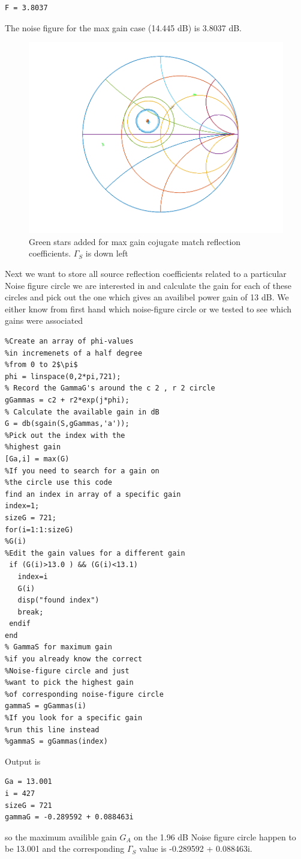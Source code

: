 \documentclass{article}
\begin{document}
\begin{multicols}{2}
\begin{verbatim}
F = 3.8037
\end{verbatim}
The noise figure for the max gain case (14.445 dB) is 3.8037 dB.
\begin{figure}[H]
\centering
  \includegraphics[width=\linewidth]{conjugate.png}
  \caption{Green stars added for max gain cojugate match reflection coefficients. $\Gamma_S$ is down left}
  \label{fig4}
\end{figure}
Next we want to store all source reflection coefficients related to a particular
Noise figure circle we are interested in and calculate the gain for
each of these circles and pick out the one which gives an availibel power gain
of 13 dB.
We either know from first hand which noise-figure circle
or we tested to see which gains were associated
\begin{verbatim}
%Create an array of phi-values
%in incremenets of a half degree
%from 0 to 2$\pi$
phi = linspace(0,2*pi,721);
% Record the GammaG's around the c 2 , r 2 circle
gGammas = c2 + r2*exp(j*phi);
% Calculate the available gain in dB
G = db(sgain(S,gGammas,'a'));
%Pick out the index with the
%highest gain
[Ga,i] = max(G) 
%If you need to search for a gain on
%the circle use this code
find an index in array of a specific gain
index=1;
sizeG = 721;
for(i=1:1:sizeG)
%G(i)
%Edit the gain values for a different gain
 if (G(i)>13.0 ) && (G(i)<13.1)
   index=i
   G(i)
   disp("found index")
   break;
 endif
end
% GammaS for maximum gain
%if you already know the correct
%Noise-figure circle and just
%want to pick the highest gain
%of corresponding noise-figure circle
gammaS = gGammas(i) 
%If you look for a specific gain
%run this line instead
%gammaS = gGammas(index) 
\end{verbatim}
Output is
\begin{verbatim}
Ga = 13.001
i = 427
sizeG = 721
gammaG = -0.289592 + 0.088463i
\end{verbatim}
so the maximum availible gain $G_A$ on the 1.96 dB Noise figure circle
happen to be 13.001 and the corresponding $\Gamma_S$ value
is -0.289592 + 0.088463i.


\end{multicols}
\end{document}
